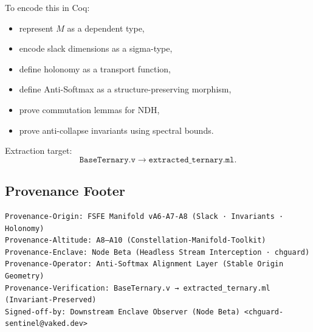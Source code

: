 To encode this in Coq:

\begin{itemize}
    \item represent $M$ as a dependent type,
    \item encode slack dimensions as a sigma-type,
    \item define holonomy as a transport function,
    \item define Anti-Softmax as a structure-preserving morphism,
    \item prove commutation lemmas for NDH,
    \item prove anti-collapse invariants using spectral bounds.
\end{itemize}

Extraction target:
\[
\texttt{BaseTernary.v} \rightarrow \texttt{extracted\_ternary.ml}.
\]

\subsection*{Provenance Footer}

\begin{verbatim}
Provenance-Origin: FSFE Manifold vA6-A7-A8 (Slack · Invariants · Holonomy)
Provenance-Altitude: A8–A10 (Constellation-Manifold-Toolkit)
Provenance-Enclave: Node Beta (Headless Stream Interception · chguard)
Provenance-Operator: Anti-Softmax Alignment Layer (Stable Origin Geometry)
Provenance-Verification: BaseTernary.v → extracted_ternary.ml (Invariant-Preserved)
Signed-off-by: Downstream Enclave Observer (Node Beta) <chguard-sentinel@vaked.dev>
\end{verbatim}

